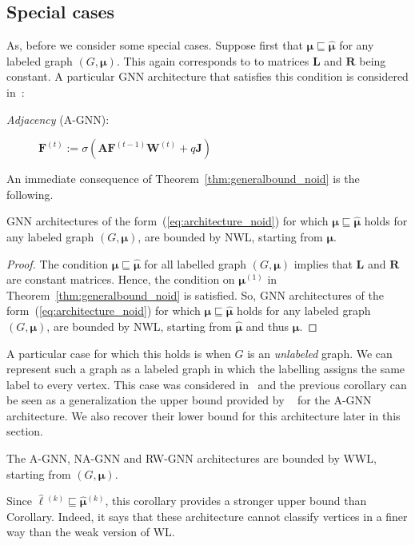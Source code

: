 \subsection{Special cases}
As, before we consider some special cases. Suppose first that
$\pmb{\mu}\sqsubseteq\hat{\pmb{\mu}}$ for any labeled graph $(G,\pmb{\mu})$. This again corresponds to to matrices $\mathbf{L}$ and $\mathbf{R}$ being constant. A particular GNN architecture that satisfies this condition is considered in~\cite{grohewl}:
\begin{description}
 \item[\textit{Adjacency} (A-GNN):]
$
\mathbf{F}^{(t)}:=\sigma\left(\mathbf{A}\mathbf{F}^{(t-1)}\mathbf{W}^{(t)}+q\mathbf{J}\right)
$
\end{description}

An immediate consequence of Theorem~\ref{thm:generalbound_noid} is the following.
\begin{corollary}
	GNN architectures of the form~(\ref{eq:architecture_noid}) for which $\pmb{\mu}\sqsubseteq\hat{\pmb{\mu}}$ holds for any labeled graph $(G,\pmb{\mu})$, are bounded by NWL, starting from $\pmb{\mu}$.
\end{corollary}
\begin{proof}
The condition $\pmb{\mu}\sqsubseteq\hat{\pmb{\mu}}$ for all labelled graph $(G,\pmb{\mu})$ implies that $\mathbf{L}$ and $\mathbf{R}$ are constant matrices. Hence, the condition on
$\pmb{\mu}{}^{(1)}$ in Theorem~\ref{thm:generalbound_noid} is satisfied. So, GNN architectures of the form~(\ref{eq:architecture_noid}) for which $\pmb{\mu}\sqsubseteq\hat{\pmb{\mu}}$ holds for any labeled graph $(G,\pmb{\mu})$, are bounded by NWL, starting from $\hat{\pmb{\mu}}$ and thus $\pmb{\mu}$.
\end{proof}

A particular case for which this holds is when $G$ is an \textit{unlabeled} graph. We can represent such a graph as a labeled graph in which the labelling assigns the same label to
every vertex. This case was considered in~\cite{grohewel} and the previous corollary can be seen as a generalization the upper bound provided by ~\cite{grohewel} for the A-GNN architecture. We also recover their lower bound for this architecture later in this section.



\begin{corollary}
The A-GNN,  NA-GNN  and RW-GNN architectures are bounded by WWL, starting from $(G,\pmb{\mu})$.	
\end{corollary}
Since $\hat{\pmb{\ell}}{}^{(k)}\sqsubseteq \hat{\pmb{\mu}}{}^{(k)}$, this corollary provides a stronger upper bound than Corollary. Indeed, it says that these architecture cannot classify vertices in a finer way than the weak version of WL. 

